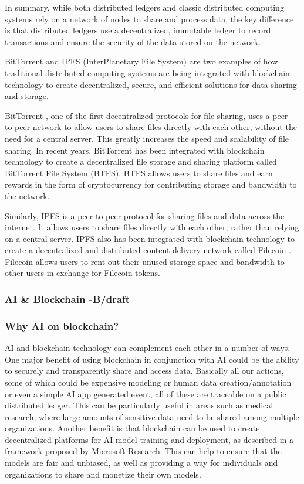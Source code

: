 \documentclass{article}
\begin{document}
In summary, while both distributed ledgers and classic distributed computing systems rely on a network of nodes to share and process data, the key difference is that distributed ledgers use a decentralized, immutable ledger to record transactions and ensure the security of the data stored on the network.

BitTorrent and IPFS (InterPlanetary File System)\cite{benet2014ipfs} are two examples of how traditional distributed computing systems are being integrated with blockchain technology to create decentralized, secure, and efficient solutions for data sharing and storage.

BitTorrent \cite{bittorent}, one of the first decentralized protocols for file sharing, uses a peer-to-peer network to allow users to share files directly with each other, without the need for a central server. This greatly increases the speed and scalability of file sharing. In recent years, BitTorrent has been integrated with blockchain technology to create a decentralized file storage and sharing platform called BitTorrent File System (BTFS)\cite{btfs}. BTFS allows users to share files and earn rewards in the form of cryptocurrency for contributing storage and bandwidth to the network.

Similarly, IPFS \cite{benet2014ipfs}\cite{ipfs} is a peer-to-peer protocol for sharing files and data across the internet. It allows users to share files directly with each other, rather than relying on a central server. IPFS also has been integrated with blockchain technology to create a decentralized and distributed content delivery network called Filecoin \cite{filecoin}. Filecoin allows users to rent out their unused storage space and bandwidth to other users in exchange for Filecoin tokens.

\subsubsection{AI \& Blockchain -B/draft}

\subsubsection{Why AI on blockchain?}

AI and blockchain technology can complement each other in a number of ways. One major benefit of using blockchain in conjunction with AI could be the ability to securely and transparently share and access data. Basically all our actions, some of which could be expensive modeling or human data creation/annotation or even a simple AI app generated event, all of these are traceable on a public distributed ledger. This can be particularly useful in areas such as medical research, where large amounts of sensitive data need to be shared among multiple organizations. Another benefit is that blockchain can be used to create decentralized platforms for AI model training and deployment, as described in a framework proposed by Microsoft Research\cite{DBLP:journals/corr/abs-1907-07247}. This can help to ensure that the models are fair and unbiased, as well as providing a way for individuals and organizations to share and monetize their own models.
\end{document}
